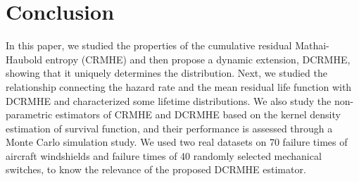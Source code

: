 \documentclass[11pt,reqno]{amsart}
\theoremstyle{tight}
\begin{document}
\section{Conclusion}
In this paper, we studied the properties of the cumulative residual Mathai-Haubold entropy (CRMHE) and then propose a dynamic extension, DCRMHE, showing that it uniquely determines the distribution. Next, we studied the relationship connecting the hazard rate and the mean residual life function with DCRMHE and characterized some lifetime distributions. We also study the non-parametric estimators of CRMHE and DCRMHE based on the kernel density estimation of survival function, and their performance is assessed through a Monte Carlo simulation study. We used two real datasets on 70 failure times of aircraft windshields and failure times of 40 randomly selected mechanical switches, to know the relevance of the proposed DCRMHE estimator.
\end{document}
